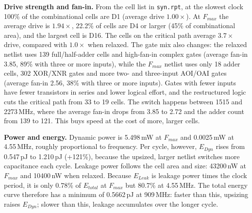 \documentclass[11pt]{article}
\begin{document}
\textbf{Drive strength and fan-in.} From the cell list in \texttt{syn.rpt}, at the slowest clock 100\% of the combinational cells are D1 (average drive $1.00\times$). At $F_{max}$ the average drive is $1.94\times$, 22.2\% of cells are D4 or larger (45\% of combinational area), and the largest cell is D16. The cells on the critical path average $3.7\times$ drive, compared with $1.0\times$ when relaxed. The gate mix also changes: the relaxed netlist uses 139 full/half-adder cells and high-fan-in complex gates (average fan-in 3.85, 89\% with three or more inputs), while the $F_{max}$ netlist uses only 18 adder cells, 302 XOR/XNR gates and more two- and three-input AOI/OAI gates (average fan-in 2.56, 38\% with three or more inputs). Gates with fewer inputs have fewer transistors in series and lower logical effort, and the restructured logic cuts the critical path from 33 to 19 cells. The switch happens between 1515 and 2273\,MHz, where the average fan-in drops from 3.85 to 2.72 and the adder count from 139 to 121. This buys speed at the cost of more, larger cells.

\textbf{Power and energy.} Dynamic power is 5.498\,mW at $F_{max}$ and 0.0025\,mW at 4.55\,MHz, roughly proportional to frequency. Per cycle, however, $E_{Dyn}$ rises from 0.547\,pJ to 1.210\,pJ (+121\%), because the upsized, larger netlist switches more capacitance each cycle. Leakage power follows the cell area and size: 43200\,nW at $F_{max}$ and 10400\,nW when relaxed. Because $E_{Leak}$ is leakage power times the clock period, it is only 0.78\% of $E_{total}$ at $F_{max}$ but 80.7\% at 4.55\,MHz. The total energy curve therefore has a minimum of 0.5662\,pJ at 909\,MHz: faster than this, upsizing raises $E_{Dyn}$; slower than this, leakage accumulates over the longer cycle.
\end{document}
